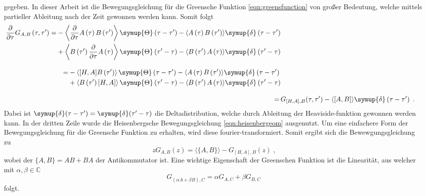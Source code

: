 gegeben.
In dieser Arbeit ist die Bewegungsgleichung für die Greensche Funktion \eqref{eqn:greensfunction} von großer Bedeutung, welche mittels 
partieller Ableitung nach der Zeit gewonnen werden kann.\cite{greensfunction}
Somit folgt
\begin{align*}
    \begin{split}
    \frac{\partial}{\partial \tau} G_{A,B} \left (\tau, \tau' \right) = 
    &- \left \langle \frac{\partial}{\partial \tau}A \left (\tau \right ) B \left ( \tau' \right ) \right \rangle
    \symup{\Theta} \left ( \tau - \tau' \right) -  \langle A \left (\tau \right ) B \left ( \tau' \right ) \rangle \symup{\delta} \left ( \tau - \tau' \right)\\
    &+ \left \langle B \left ( \tau' \right ) \frac{\partial}{\partial \tau}A \left (\tau \right ) \right \rangle \symup{\Theta} \left ( \tau' - \tau \right)
    -  \langle B \left ( \tau' \right ) A \left (\tau \right ) \rangle \symup{\delta} \left ( \tau' - \tau \right)
    \end{split}
    \\[2ex]
    \begin{split}
    = &- \left \langle [H,A] B \left ( \tau' \right ) \right \rangle
    \symup{\Theta} \left ( \tau - \tau' \right) -  \langle A \left (\tau \right ) B \left ( \tau' \right ) \rangle \symup{\delta} \left ( \tau - \tau' \right)\\
    &+ \left \langle B \left ( \tau' \right ) [H,A] \right \rangle \symup{\Theta} \left ( \tau' - \tau \right)
    -  \langle B \left ( \tau' \right ) A \left (\tau \right ) \rangle \symup{\delta} \left ( \tau' - \tau \right)
    \end{split}
    \\[2ex]
    =\, & G_{[H,A],B}(\tau, \tau') - \langle [A,B] \rangle \symup{\delta} \left ( \tau - \tau' \right) \; \text{.}
\end{align*} 
Dabei ist  $\symup{\delta} (\tau-\tau') = \symup{\delta} (\tau'-\tau) $ die Deltadistribution, welche durch Ableitung der Heaviside-funktion gewonnen werden kann.
In der dritten Zeile wurde die Heisenbergsche Bewegungsgleichung \eqref{eqn:heisenbergeom} ausgenutzt.
Um eine einfachere Form der Bewegungsgleichung für die Greensche Funktion zu erhalten, wird diese fourier-transformiert.
Somit ergibt sich die Bewewgungsgleichung zu 
\begin{equation}
    zG_{A,B}(z) = \langle \{A,B\} \rangle - G_{[H,A],B}(z) \; \text{,} \label{eqn:fouriereom}
\end{equation} 
wobei der $\{ A,B \} = AB+BA$ der Antikommutator ist.\cite{greensfunction}
Eine wichtige Eigenschaft der Greenschen Funktion ist die Linearität, aus welcher mit $\alpha, \beta \in \mathbb{C}$
\begin{equation*}
    G_{(\alpha A + \beta B), C} = \alpha G_{A,C} + \beta G_{B,C}
\end{equation*}
folgt.

